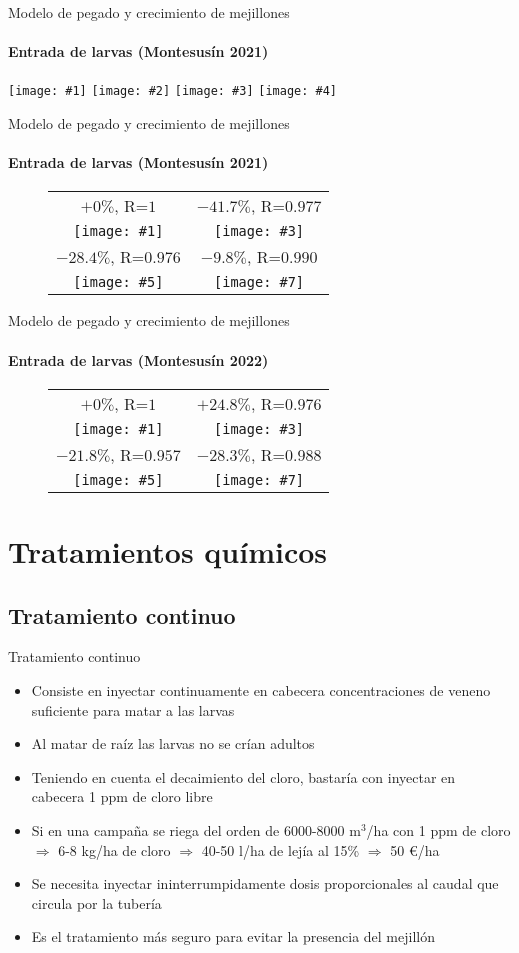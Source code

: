 \documentclass[pdr]{beamer}
\newcommand{\FIGIV}[4]
{
	\begin{center}
		\texttt{[image: \#1]}
		\texttt{[image: \#2]}
		\texttt{[image: \#3]}
		\texttt{[image: \#4]}
	\end{center}
}
\newcommand{\FIGIVB}[8]
{
	\begin{figure}[ht!]
		\centering
		\begin{tabular}{cc}
			#2&#4\\
			\texttt{[image: \#1]}&
			\texttt{[image: \#3]}\\
			#6&#8\\
			\texttt{[image: \#5]}&
			\texttt{[image: \#7]}
		\end{tabular}
	\end{figure}
}
\begin{document}
\begin{frame}{Modelo de pegado y crecimiento de mejillones}
	\framesubtitle{Entrada de larvas (Montesusín 2021)}
	\FIGIV{2021-mussel-input-constant.eps}{2021-mussel-input-measured.eps}
	{2021-mussel-input-uniform.eps}{2021-mussel-input-random.eps}
\end{frame}

\begin{frame}{Modelo de pegado y crecimiento de mejillones}
	\framesubtitle{Entrada de larvas (Montesusín 2021)}
	\FIGIVB{2021-mussel-constant.pdf}{$+0\%$, R=$1$}
	{2021-mussel-measured.pdf}{$-41.7\%$, R=$0.977$}
	{2021-mussel-uniform.pdf}{$-28.4\%$, R=$0.976$}
	{2021-mussel-random.pdf}{$-9.8\%$, R=$0.990$}
\end{frame}

\begin{frame}{Modelo de pegado y crecimiento de mejillones}
	\framesubtitle{Entrada de larvas (Montesusín 2022)}
	\FIGIVB{2022-mussel-constant.pdf}{$+0\%$, R=$1$}
	{2022-mussel-measured.pdf}{$+24.8\%$, R=$0.976$}
	{2022-mussel-uniform.pdf}{$-21.8\%$, R=$0.957$}
	{2022-mussel-random.pdf}{$-28.3\%$, R=$0.988$}
\end{frame}

\section{Tratamientos químicos}

\subsection{Tratamiento continuo}

\begin{frame}{Tratamiento continuo}
	\begin{itemize}
		\item Consiste en inyectar continuamente en cabecera
			concentraciones de veneno suficiente para matar a las
			larvas
		\item Al matar de raíz las larvas no se crían adultos
		\item Teniendo en cuenta el decaimiento del cloro, bastaría con
			inyectar en cabecera 1 ppm de cloro libre
		\item Si en una campaña se riega del orden de 6000-8000 m$^3$/ha
			con 1 ppm de cloro $\Rightarrow$
			6-8 kg/ha de cloro $\Rightarrow$
			40-50 l/ha de lejía al 15\% $\Rightarrow$
			50 €/ha
		\item Se necesita inyectar ininterrumpidamente dosis
			proporcionales al caudal que circula por la tubería
		\item Es el tratamiento más seguro para evitar la presencia del
			mejillón
	\end{itemize}
\end{frame}
\end{document}
